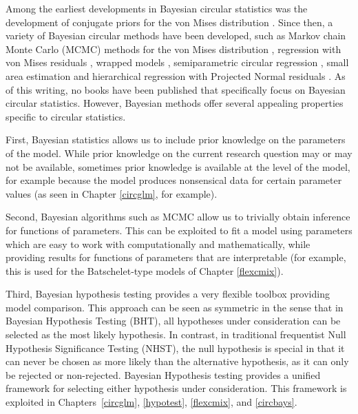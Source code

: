 \documentclass[12pt, a4paper]{book}\usepackage[]{graphicx}\usepackage{xcolor}
\begin{document}
Among the earliest developments in Bayesian circular statistics was the development of conjugate priors for the von Mises distribution \citep{mardia1976bayesian}. Since then, a variety of Bayesian circular methods have been developed, such as Markov chain Monte Carlo (MCMC) methods for the von Mises distribution \citep{damien1999fullbayes, forbes2015fast}, regression with von Mises residuals \citep{gill2010}, wrapped models \citep{ravindran2011bayesian}, semiparametric circular regression \citep{george2006semiparametric, mcvinish2008semiparametric, Bhattacharya2009}, small area estimation \citep{hernandez2016hierarchical} and hierarchical regression with Projected Normal residuals \citep{nunez2011bayesian, nunez2014bayesian}. As of this writing, no books have been published that specifically focus on Bayesian circular statistics. However, Bayesian methods offer several appealing properties specific to circular statistics.

First, Bayesian statistics allows us to include prior knowledge on the parameters of the model. While prior knowledge on the current research question may or may not be available, sometimes prior knowledge is available at the level of the model, for example because the model produces nonsensical data for certain parameter values (as seen in Chapter \ref{circglm}, for example).

Second, Bayesian algorithms such as MCMC allow us to trivially obtain inference for functions of parameters. This can be exploited to fit a model using parameters which are easy to work with computationally and mathematically, while providing results for functions of parameters that are interpretable (for example, this is used for the Batschelet-type models of Chapter \ref{flexcmix}).

Third, Bayesian hypothesis testing provides a very flexible toolbox providing model comparison. This approach can be seen as symmetric in the sense that in Bayesian Hypothesis Testing (BHT), all hypotheses under consideration can be selected as the most likely hypothesis. In contrast, in traditional frequentist Null Hypothesis Significance Testing (NHST), the null hypothesis is special in that it can never be chosen as more likely than the alternative hypothesis, as it can only be rejected or non-rejected. Bayesian Hypothesis testing provides a unified framework for selecting either hypothesis under consideration. This framework is exploited in Chapters~\ref{circglm}, \ref{hypotest}, \ref{flexcmix}, and \ref{circbays}. %
\end{document}
